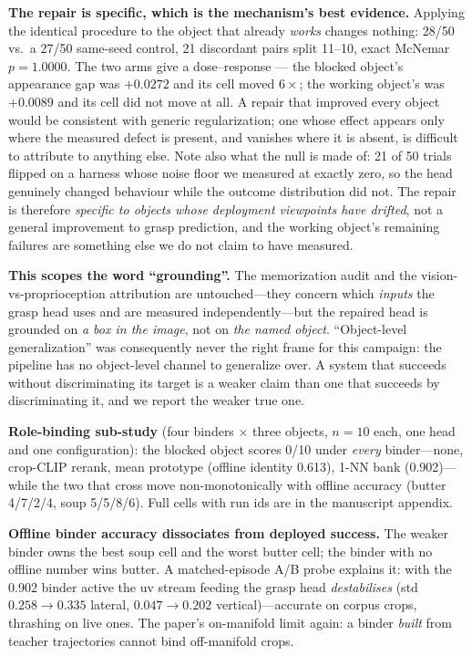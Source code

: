 \documentclass[10pt,letterpaper]{article}
\begin{document}
\noindent \textbf{The repair is specific, which is the mechanism's best
evidence.} Applying the identical procedure to the object that already
\emph{works} changes nothing: 28/50 vs.\ a 27/50 same-seed control, 21
discordant pairs split 11--10, exact McNemar $p{=}1.0000$. The two arms give a
dose--response --- the blocked object's appearance gap was $+0.0272$ and its
cell moved $6\times$; the working object's was $+0.0089$ and its cell did not
move at all. A repair that improved every object would be consistent with
generic regularization; one whose effect appears only where the measured defect
is present, and vanishes where it is absent, is difficult to attribute to
anything else. Note also what the null is made of: 21 of 50 trials flipped on a
harness whose noise floor we measured at exactly zero, so the head genuinely
changed behaviour while the outcome distribution did not. The repair is
therefore \emph{specific to objects whose deployment viewpoints have drifted},
not a general improvement to grasp prediction, and the working object's
remaining failures are something else we do not claim to have measured.

\noindent \textbf{This scopes the word ``grounding''.} The memorization audit
and the vision-vs-proprioception attribution are untouched---they concern which
\emph{inputs} the grasp head uses and are measured independently---but the
repaired head is grounded on \emph{a box in the image}, not on \emph{the named
object}. ``Object-level generalization'' was consequently never the right frame
for this campaign: the pipeline has no object-level channel to generalize over.
A system that succeeds without discriminating its target is a weaker claim than
one that succeeds by discriminating it, and we report the weaker true one.

\noindent \textbf{Role-binding sub-study} (four binders $\times$ three objects, $n{=}10$ each, one head and one configuration): the blocked object scores 0/10 under \emph{every} binder---none, crop-CLIP rerank, mean prototype (offline identity 0.613), 1-NN bank (0.902)---while the two that cross move non-monotonically with offline accuracy (butter 4/7/2/4, soup 5/5/8/6). Full cells with run ids are in the manuscript appendix.

\noindent \textbf{Offline binder accuracy dissociates from deployed success.}
The weaker binder owns the best soup cell and the worst butter cell; the
binder with no offline number wins butter. A matched-episode A/B probe explains
it: with the 0.902 binder active the uv stream feeding the grasp head
\emph{destabilises} (std $0.258\to0.335$ lateral, $0.047\to0.202$
vertical)---accurate on corpus crops, thrashing on live ones. The paper's
on-manifold limit again: a binder \emph{built} from teacher trajectories cannot
bind off-manifold crops.
\end{document}
